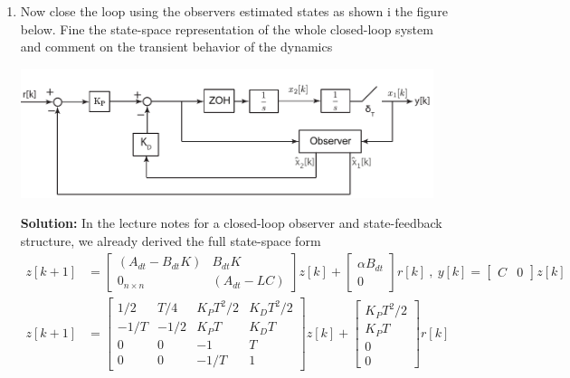 \documentclass[twoside]{article}
\begin{document}
\begin{enumerate}
\item Now close the loop using the observers estimated states as shown i the figure below. Fine the state-space representation of the whole closed-loop system 
and comment on the transient behavior of the dynamics

\begin{center}
  \begin{minipage}[h]{0.9\linewidth}
    \begin{center}
      \includegraphics[width=0.95\textwidth]{block_PD_obs}
    \end{center}
  \end{minipage}
    \end{center}

\textbf{Solution:} In the lecture notes for a closed-loop observer and state-feedback structure, we already derived the full state-space form
\begin{align*}
  z[k+1] &= \left[ \begin{array}{cc} (A_{dt} - B_{dt} K) & B_{dt} K\\ 0_{n \times n}
                                              & (A_{dt} - LC) \end{array}
                                                \right] z[k] + \left[ \begin{array}{c} \alpha B_{dt} \\ 0 \end{array} \right] r[k]
\ , \
 y[k] = \left[ \begin{array}{cc} C & 0  \end{array}
                                                \right] z[k]  
                                                \\
  z[k+1] &= \left[ \begin{array}{cc|cc} 1/2 & T/4 & K_P T^2/2 & K_D T^2/2 \\ -1/T & -1/2 & K_P T & K_D T \\ \hline 0 & 0 & -1 & T \\ 0 & 0 & -1/T & 1 \end{array}
                                                \right] z[k] + \left[ \begin{array}{c} K_P T^2/2 \\ K_P T \\ \hline 0 \\ 0 \end{array} \right] r[k]                                              
\end{align*}
%



\end{enumerate}


\end{document}
